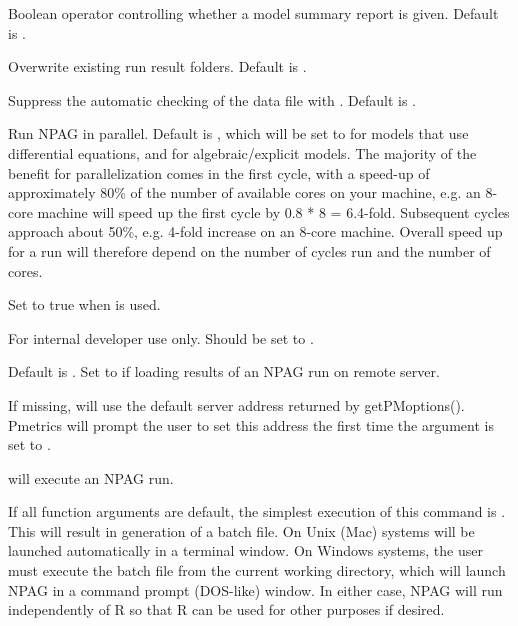 \documentclass[a4paper]{book}
\begin{document}
\begin{Arguments}
\begin{ldescription}
\item[\code{silent}] Boolean operator controlling whether a model summary report is given.  Default is .

\item[\code{overwrite}] Overwrite existing run result folders.  Default is .

\item[\code{nocheck}] Suppress the automatic checking of the data file with .  Default is .

\item[\code{parallel}] Run NPAG in parallel.  Default is , which will be set to  for models that use
differential equations, and  for algebraic/explicit models.  The majority of the benefit for parallelization comes
in the first cycle, with a speed-up of approximately 80\% of the number of available cores on your machine, e.g. an 8-core machine
will speed up the first cycle by 0.8 * 8 = 6.4-fold.  Subsequent cycles approach about 50\%, e.g. 4-fold increase on an 8-core
machine.  Overall speed up for a run will therefore depend on the number of cycles run and the number of cores.

\item[\code{batch}] Set to true when  is used.

\item[\code{alq}] For internal developer use only.  Should be set to .

\item[\code{remote}] Default is .  Set to  if loading results of an NPAG run on remote server.

\item[\code{server\_address}] If missing, will use the default server address returned by getPMoptions(). 
Pmetrics will prompt the user to set this address the first time the  argument is set to .
\end{ldescription}
\end{Arguments}
%
\begin{Details}\relax
{} will execute an NPAG run.

If all function arguments are default, the simplest execution of this command is 
.  This will result in generation of a batch file.  On Unix (Mac) systems
will be launched automatically in a terminal window.  On Windows systems, the user
must execute the batch file from the current working directory, which will launch NPAG
in a command prompt (DOS-like) window.  In either case, NPAG will run independently of R
so that R can be used for other purposes if desired.
\end{Details}
\end{document}

